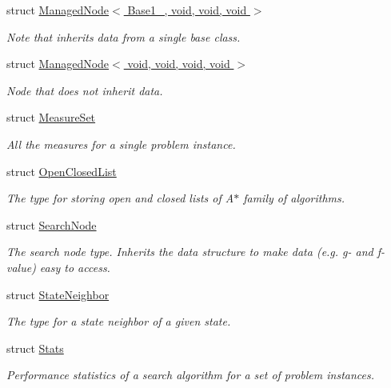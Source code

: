\begin{DoxyCompactItemize}
struct \hyperlink{structslb_1_1core_1_1sb_1_1ManagedNode_3_01Base1___00_01void_00_01void_00_01void_01_4}{Managed\+Node$<$ Base1\+\_\+, void, void, void $>$}
\begin{DoxyCompactList}\small\item\em Note that inherits data from a single base class. \end{DoxyCompactList}\item 
struct \hyperlink{structslb_1_1core_1_1sb_1_1ManagedNode_3_01void_00_01void_00_01void_00_01void_01_4}{Managed\+Node$<$ void, void, void, void $>$}
\begin{DoxyCompactList}\small\item\em Node that does not inherit data. \end{DoxyCompactList}\item 
struct \hyperlink{structslb_1_1core_1_1sb_1_1MeasureSet}{Measure\+Set}
\begin{DoxyCompactList}\small\item\em All the measures for a single problem instance. \end{DoxyCompactList}\item 
struct \hyperlink{structslb_1_1core_1_1sb_1_1OpenClosedList}{Open\+Closed\+List}
\begin{DoxyCompactList}\small\item\em The type for storing open and closed lists of {\ttfamily A$\ast$} family of algorithms. \end{DoxyCompactList}\item 
struct \hyperlink{structslb_1_1core_1_1sb_1_1SearchNode}{Search\+Node}
\begin{DoxyCompactList}\small\item\em The search node type. Inherits the data structure to make data (e.\+g. g-\/ and f-\/value) easy to access. \end{DoxyCompactList}\item 
struct \hyperlink{structslb_1_1core_1_1sb_1_1StateNeighbor}{State\+Neighbor}
\begin{DoxyCompactList}\small\item\em The type for a state neighbor of a given state. \end{DoxyCompactList}\item 
struct \hyperlink{structslb_1_1core_1_1sb_1_1Stats}{Stats}
\begin{DoxyCompactList}\small\item\em Performance statistics of a search algorithm for a set of problem instances. \end{DoxyCompactList}\end{DoxyCompactItemize}
